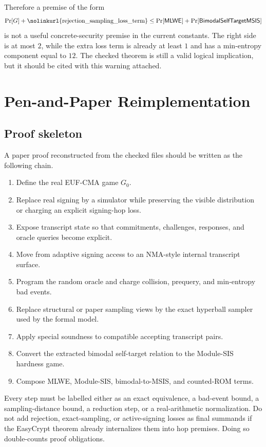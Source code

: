 \documentclass[11pt]{report}
\DeclareRobustCommand{\ec}[1]{\ifmmode\text{\nolinkurl{#1}}\else\nolinkurl{#1}\fi}
\newcommand{\MLWE}{\mathsf{MLWE}}
\newcommand{\BMSIS}{\mathsf{BimodalSelfTargetMSIS}}
\newcommand{\Prb}{\Pr}
\theoremstyle{definition}
\theoremstyle{plain}
\begin{document}
Therefore a premise of the form
\[
  \Prb[G] + \ec{rejection\_sampling\_loss\_term}
  \le
  \Prb[\MLWE] + \Prb[\BMSIS]
\]
is not a useful concrete-security premise in the current constants.  The right
side is at most \(2\), while the extra loss term is already at least \(1\) and
has a min-entropy component equal to \(12\).  The checked theorem is still a
valid logical implication, but it should be cited with this warning attached.

\chapter{Pen-and-Paper Reimplementation}

\section{Proof skeleton}

A paper proof reconstructed from the checked files should be written as the
following chain.

\begin{enumerate}
\item Define the real EUF-CMA game \(G_0\).
\item Replace real signing by a simulator while preserving the visible
distribution or charging an explicit signing-hop loss.
\item Expose transcript state so that commitments, challenges, responses, and
oracle queries become explicit.
\item Move from adaptive signing access to an NMA-style internal transcript
surface.
\item Program the random oracle and charge collision, prequery, and
min-entropy bad events.
\item Replace structural or paper sampling views by the exact hyperball sampler
used by the formal model.
\item Apply special soundness to compatible accepting transcript pairs.
\item Convert the extracted bimodal self-target relation to the Module-SIS
hardness game.
\item Compose MLWE, Module-SIS, bimodal-to-MSIS, and counted-ROM terms.
\end{enumerate}

Every step must be labelled either as an exact equivalence, a bad-event bound,
a sampling-distance bound, a reduction step, or a real-arithmetic
normalization.  Do not add rejection, exact-sampling, or active-signing losses
as final summands if the EasyCrypt theorem already internalizes them into hop
premises.  Doing so double-counts proof obligations.
\end{document}
